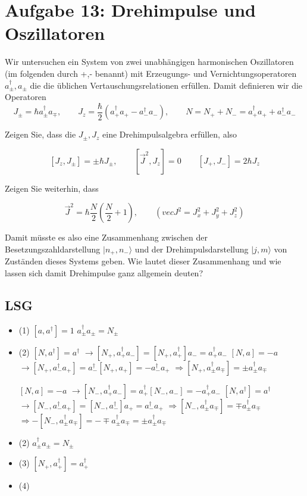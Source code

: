 



\section*{Aufgabe 13: Drehimpulse und Oszillatoren}

Wir untersuchen ein System von zwei unabhängigen harmonischen Oszillatoren (im folgenden durch +,- benannt) mit Erzeugungs- und Vernichtungsoperatoren \(a^\dagger_\pm,a_\pm\) die die üblichen Vertauschungsrelationen erfüllen. Damit definieren wir die Operatoren
\[J_\pm = \hbar a^\dagger_\pm a_\mp, \qquad 
J_z=\frac{\hbar}{2}( a^\dagger_+ a_+-a^\dagger_- a_-), \qquad 
N=N_++N_-=a^\dagger_+ a_+ + a^\dagger_- a_-
\]

Zeigen Sie, dass die \(J_\pm,J_z\) eine Drehimpulsalgebra erfüllen, also

\[ [J_z,J_\pm] = \pm \hbar J_\pm, \qquad
[\vec J^2,J_z]=0 \qquad
[J_+,J_-]=2\hbar J_z
\]

Zeigen Sie weiterhin, dass

\[ \vec J^2 = \hbar \frac{N}{2}(\frac{N}{2}+1), \qquad (vec J^2 = J^2_x+J^2_y+J^2_z)\]

Damit müsste es also eine Zusammenhang zwischen der Besetzungszahldarstellung \(|n_+,n_-\rangle\) und der Drehimpulsdarstellung \(|j,m\rangle\) von Zuständen dieses Systems geben. Wie lautet dieser Zusammenhang und wie lassen sich damit Drehimpulse ganz allgemein deuten?


\subsection*{LSG}


\begin{itemize}
\item (1) \([a,a^\dagger]=1\)  \(a^\dagger_\pm a_\pm = N_\pm\)
\item (2) \([N,a^\dagger]=a^\dagger\)  \(\rightarrow [N_+,a^\dagger_+ a_-]=[N_+,a^\dagger_+]a_-=a^\dagger_+a_-\)
 \([N,a]=-a\)  \(\rightarrow [N_+,a^\dagger_- a_+]=a^\dagger_-[N_+, a_+]=-a^\dagger_-a_+\)
\(\Rightarrow [N_+,a^\dagger_\pm a_\mp] = \pm a^\dagger_\pm a_\mp\)

\([N,a]=-a\)  \(\rightarrow [N_-,a^\dagger_+ a_-]=a^\dagger_+[N_-,a_-]=-a^\dagger_+a_-\)
 \([N,a^\dagger]=a^\dagger\)  \(\rightarrow [N_-,a^\dagger_-a_+]=[N_-,a^\dagger_-]a_+=a^\dagger_-a_+\)
\(\Rightarrow [N_-,a^\dagger_\pm a_\mp] = \mp a^\dagger_\pm a_\mp\)
\(\Rightarrow -[N_-,a^\dagger_\pm a_\mp] = - \mp a^\dagger_\pm a_\mp= \pm a^\dagger_\pm a_\mp \)


\item (2)   \(a^\dagger_\pm a_\pm = N_\pm\)
\item (3) \([N_+,a^\dagger_+]=a^\dagger_+\)
\item (4) 

\end{itemize}



